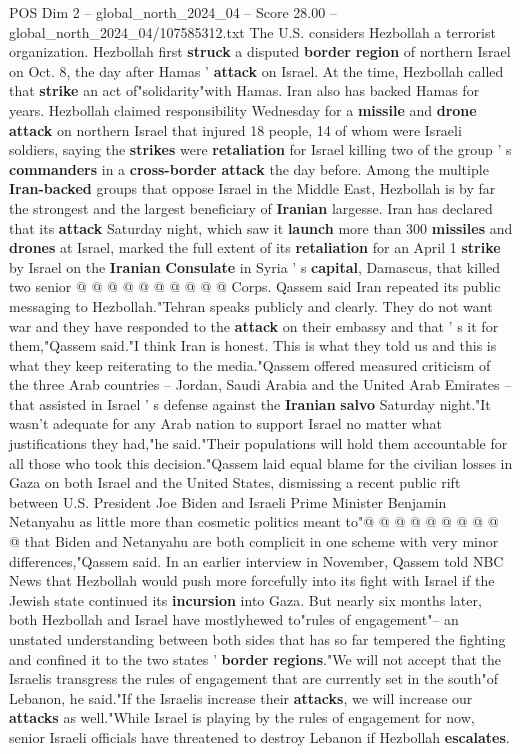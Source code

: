 \begin{textsample}{POS Dim 2 – global\_north\_2024\_04 – Score 28.00 – global\_north\_2024\_04/107585312.txt}
The U.S. considers Hezbollah a terrorist organization.
Hezbollah first \textbf{struck} a disputed \textbf{border} \textbf{region} of northern Israel on Oct. 8, the day after Hamas ' \textbf{attack} on Israel.
At the time, Hezbollah called that \textbf{strike} an act of"solidarity"with Hamas.
Iran also has backed Hamas for years.
Hezbollah claimed responsibility Wednesday for a \textbf{missile} and \textbf{drone} \textbf{attack} on northern Israel that injured 18 people, 14 of whom were Israeli soldiers, saying the \textbf{strikes} were \textbf{retaliation} for Israel killing two of the group ' s \textbf{commanders} in a \textbf{cross-border} \textbf{attack} the day before.
Among the multiple \textbf{Iran-backed} groups that oppose Israel in the Middle East, Hezbollah is by far the strongest and the largest beneficiary of \textbf{Iranian} largesse.
Iran has declared that its \textbf{attack} Saturday night, which saw it \textbf{launch} more than 300 \textbf{missiles} and \textbf{drones} at Israel, marked the full extent of its \textbf{retaliation} for an April 1 \textbf{strike} by Israel on the \textbf{Iranian} \textbf{Consulate} in Syria ' s \textbf{capital}, Damascus, that killed two senior @ @ @ @ @ @ @ @ @ @ Corps.
Qassem said Iran repeated its public messaging to Hezbollah."Tehran speaks publicly and clearly.
They do not want war and they have responded to the \textbf{attack} on their embassy and that ' s it for them,"Qassem said."I think Iran is honest.
This is what they told us and this is what they keep reiterating to the media."Qassem offered measured criticism of the three Arab countries -- Jordan, Saudi Arabia and the United Arab Emirates -- that assisted in Israel ' s defense against the \textbf{Iranian} \textbf{salvo} Saturday night."It wasn't adequate for any Arab nation to support Israel no matter what justifications they had,"he said."Their populations will hold them accountable for all those who took this decision."Qassem laid equal blame for the civilian losses in Gaza on both Israel and the United States, dismissing a recent public rift between U.S.
President Joe Biden and Israeli Prime Minister Benjamin Netanyahu as little more than cosmetic politics meant to"@ @ @ @ @ @ @ @ @ @ that Biden and Netanyahu are both complicit in one scheme with very minor differences,"Qassem said.
In an earlier interview in November, Qassem told NBC News that Hezbollah would push more forcefully into its fight with Israel if the Jewish state continued its \textbf{incursion} into Gaza.
But nearly six months later, both Hezbollah and Israel have mostlyhewed to"rules of engagement"-- an unstated understanding between both sides that has so far tempered the fighting and confined it to the two states ' \textbf{border} \textbf{regions}."We will not accept that the Israelis transgress the rules of engagement that are currently set in the south"of Lebanon, he said."If the Israelis increase their \textbf{attacks}, we will increase our \textbf{attacks} as well."While Israel is playing by the rules of engagement for now, senior Israeli officials have threatened to destroy Lebanon if Hezbollah \textbf{escalates}.

\end{textsample}
